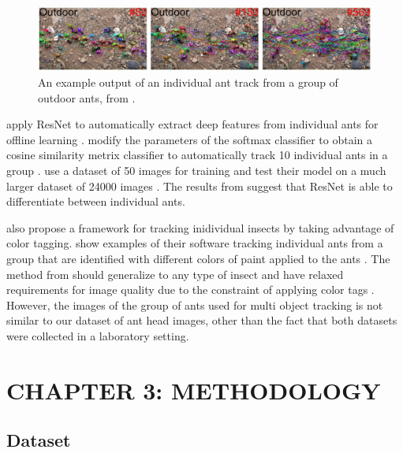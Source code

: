 \documentclass[12pt]{article}
\begin{document}
\begin{figure}[h]
    \centering
    \includegraphics[width=1\textwidth]{assets/images/ant_tracking_outdoors.png}
    \caption{An example output of an individual ant track from a group of
        outdoor ants, from \citeauthor*{cao_online_2020}
        \cite{cao_online_2020}.}
    \label{fig:ant-tracking-outdoors}
\end{figure}

\citeauthor*{cao_online_2020} apply ResNet to automatically extract deep
features from individual ants for offline learning \cite{cao_online_2020}.
\citeauthor*{cao_online_2020} modify the parameters of the softmax classifier to
obtain a cosine similarity metrix classifier to automatically track 10
individual ants in a group \cite{cao_online_2020}. \citeauthor*{cao_online_2020}
use a dataset of 50 images for training and test their model on a much larger
dataset of 24000 images \cite{cao_online_2020}. The results from
\citeauthor*{cao_online_2020} suggest that ResNet is able to differentiate
between individual ants.

\citeauthor*{gal_antrax_2020} also propose a framework for tracking inidividual
insects by taking advantage of color tagging. \citeauthor*{gal_antrax_2020} show
examples of their software tracking individual ants from a group that are
identified with different colors of paint applied to the ants
\cite{gal_antrax_2020}. The method from \citeauthor*{gal_antrax_2020} should
generalize to any type of insect and have relaxed requirements for image quality
due to the constraint of applying color tags \cite{gal_antrax_2020}.  However,
the images of the group of ants used for multi object tracking is not similar to
our dataset of ant head images, other than the fact that both datasets were
collected in a laboratory setting.

\newpage
\section{CHAPTER 3: METHODOLOGY}

\subsection{Dataset}
\end{document}
